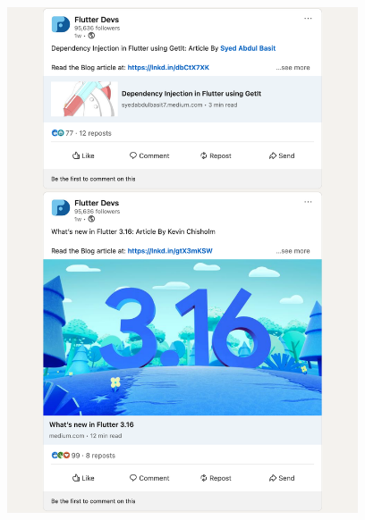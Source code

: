 \Continuing
\begin{center}
    \includegraphics[width=28em]{flutter-devs-posts-p5}
\end{center}
\WillContinue
\pagebreak


